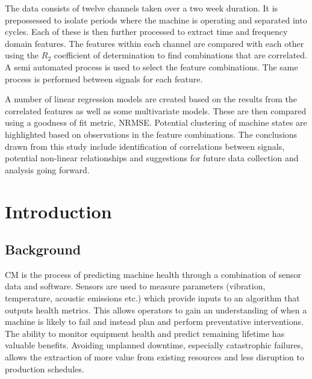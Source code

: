 \documentclass[]{article}
\begin{document}
The data consists of twelve channels taken over a two week duration. It is prepossessed to isolate periods where the machine is operating and separated into cycles. Each of these is then further processed to extract time and frequency domain features. The features within each channel are compared with each other using the $R_2$ coefficient of determination to find combinations that are correlated. A semi automated process is used to select the feature combinations. The same process is performed between signals for each feature. 

A number of linear regression models are created based on the results from the correlated features as well as some multivariate models. These are then compared using a goodness of fit metric, \gls{NRMSE}. Potential clustering of machine states are highlighted based on observations in the feature combinations. The conclusions drawn from this study include identification of correlations between signals, potential non-linear relationships and suggestions for future data collection and analysis going forward.
\clearpage

\setcounter{tocdepth}{3}
\tableofcontents
\newpage

\listoffigures
\listoftables
\newpage

\printnoidxglossary[type=\acronymtype, style=list, nogroupskip=true]
\newpage


\section{Introduction}
\subsection{Background}
\gls{CM} is the process of predicting machine health through a combination of sensor data and software. Sensors are used to measure parameters (vibration, temperature, acoustic emissions etc.) which provide inputs to an algorithm that outputs health metrics. This allows operators to gain an understanding of when a machine is likely to fail and instead plan and perform preventative interventions. The ability to monitor equipment health and predict remaining lifetime has valuable benefits. Avoiding unplanned downtime, especially catastrophic failures, allows the extraction of more value from existing resources and less disruption to production schedules.
\end{document}
